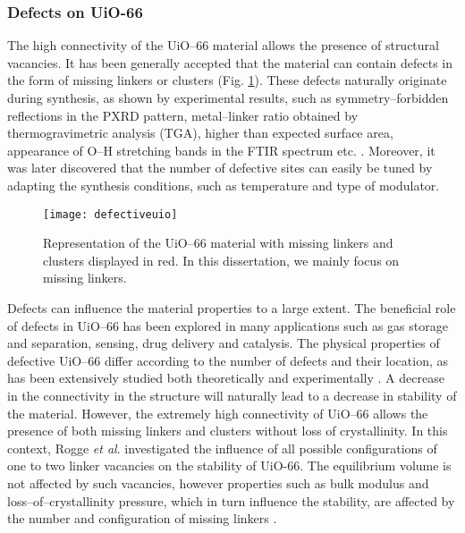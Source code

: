 \subsubsection*{Defects on UiO-66}
The high connectivity of the UiO--66 material allows the presence of structural vacancies. It has been generally accepted that the material can contain defects in the form of missing linkers or clusters (Fig. \ref{fig:defectiveuio}). These defects naturally originate during synthesis, as shown by experimental results, such as symmetry--forbidden reflections in the PXRD pattern, metal--linker ratio obtained by thermogravimetric analysis (TGA), higher than expected surface area, appearance of O--H stretching bands in the FTIR spectrum etc. \cite{shearer2014tuned, valenzano2011disclosing}. Moreover, it was later discovered that the number of defective sites can easily be tuned by adapting the synthesis conditions, such as temperature and type of modulator\cite{wu2013unusual, shearer2016defect}.
\begin{figure}[!hbtp]
	\centering
 	\texttt{[image: defectiveuio]}
	\caption{Representation of the UiO--66 material with missing linkers and clusters displayed in red. In this dissertation, we mainly focus on missing linkers.}
	\label{fig:defectiveuio}
\end{figure}
\npar
Defects can influence the material properties to a large extent. The beneficial role of defects in UiO--66 has been explored in many applications such as gas storage and separation\cite{wu2013unusual, ren2014modulated}, sensing\cite{stassen2016towards}, drug delivery\cite{cunha2013rationale} and catalysis\cite{vermoortele2013synthesis, rogge2017metal}. The physical properties of defective UiO--66 differ according to the number of defects and their location, as has been extensively studied both theoretically and experimentally \cite{rogge2016thermodynamic, devos2017missing, cliffe2014correlated, borges2016proton}. A decrease in the connectivity in the structure will naturally lead to a decrease in stability of the material. However, the extremely high connectivity of UiO--66 allows the presence of both missing linkers and clusters without loss of crystallinity. In this context, Rogge \textit{et al}. investigated the influence of all possible configurations of one to two linker vacancies on the stability of UiO-66. The equilibrium volume is not affected by such vacancies, however properties such as bulk modulus and loss--of--crystallinity pressure, which in turn influence the stability, are affected by the number and configuration of missing linkers \cite{rogge2016thermodynamic}. 
